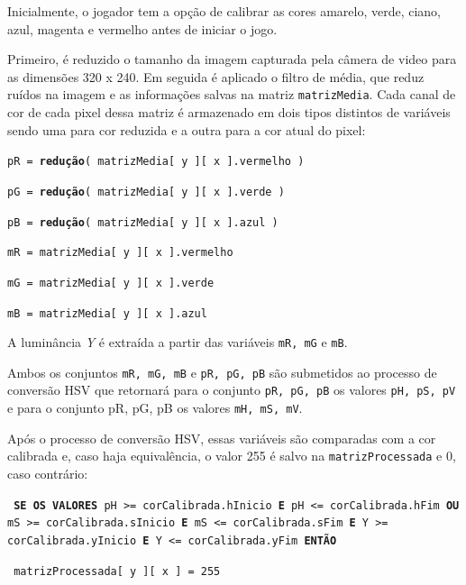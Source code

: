\documentclass[12pt]{article}
\begin{document}
Inicialmente, o jogador tem a op\c c\~ao de calibrar as cores amarelo, verde, ciano, azul, magenta e vermelho antes de iniciar o jogo.

Primeiro, \'e reduzido o tamanho da imagem capturada pela c\^amera de video para as dimens\~oes 320 x 240.
Em seguida \'e aplicado o filtro de m\'edia, que reduz ru\'idos na imagem e as informa\c c\~oes salvas na matriz \texttt{matrizMedia}.
Cada canal de cor de cada pixel dessa matriz \'e armazenado em dois tipos distintos de vari\'aveis sendo uma para cor reduzida
e a outra para a cor atual do pixel:

\texttt{\footnotesize{pR = \textbf{redu\c c\~ao}( matrizMedia[ y ][ x ].vermelho )}}

\texttt{\footnotesize{pG = \textbf{redu\c c\~ao}( matrizMedia[ y ][ x ].verde )}}

\texttt{\footnotesize{pB = \textbf{redu\c c\~ao}( matrizMedia[ y ][ x ].azul )}}

\vspace{0.5cm}

\texttt{\footnotesize{mR = matrizMedia[ y ][ x ].vermelho}}

\texttt{\footnotesize{mG = matrizMedia[ y ][ x ].verde}}

\texttt{\footnotesize{mB = matrizMedia[ y ][ x ].azul}}


A lumin\^ancia \emph{Y} \'e extra\'ida a partir das vari\'aveis \texttt{mR, mG} e \texttt{mB}.

Ambos os conjuntos \texttt{mR, mG, mB} e \texttt{pR, pG, pB} s\~ao submetidos ao processo de convers\~ao HSV que retornar\'a
para o conjunto \texttt{pR, pG, pB} os valores \texttt{pH, pS, pV} e para o conjunto {pR, pG, pB} os valores \texttt{mH, mS, mV}.

Ap\'os o processo de convers\~ao HSV, essas vari\'aveis s\~ao comparadas com a cor calibrada e, caso haja equival\^encia,
o valor 255 \'e salvo na \texttt{matrizProcessada} e 0, caso contr\'ario:

\noindent \texttt{\footnotesize{ \textbf{SE OS VALORES}} {pH >= corCalibrada.hInicio}
 \footnotesize{\textbf{E}} \footnotesize{pH <= corCalibrada.hFim} \footnotesize{\textbf{OU}}
  \footnotesize{mS >= corCalibrada.sInicio} \footnotesize{\textbf{E}} \footnotesize{mS <= corCalibrada.sFim}
   \footnotesize{\textbf{E}} \footnotesize{Y >= corCalibrada.yInicio} \footnotesize{\textbf{E}}
    \footnotesize{Y <= corCalibrada.yFim} {\textbf{ENT\~AO}}}

\hspace{0.3cm} \texttt{\footnotesize{ matrizProcessada[ y ][ x ] = 255}}
\end{document}
